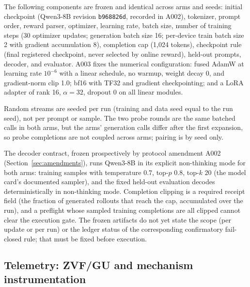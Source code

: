 \documentclass[11pt]{article}
\begin{document}
The following components are frozen and identical across arms and seeds: initial checkpoint (Qwen3-8B revision \texttt{b968826d}, recorded in A002), tokenizer, prompt order, reward parser, optimizer, learning rate, batch size, number of training steps (30 optimizer updates; generation batch size 16; per-device train batch size 2 with gradient accumulation 8), completion cap (1{,}024 tokens), checkpoint rule (final registered checkpoint, never selected by online reward), held-out prompts, decoder, and evaluator. A003 fixes the numerical configuration: fused AdamW at learning rate $10^{-6}$ with a linear schedule, no warmup, weight decay 0, and gradient-norm clip 1.0; bf16 with TF32 and gradient checkpointing; and a LoRA adapter of rank 16, $\alpha=32$, dropout 0 on all linear modules.

Random streams are seeded per run (training and data seed equal to the run seed), not per prompt or sample. The two probe rounds are the same batched calls in both arms, but the arms' generation calls differ after the first expansion, so probe completions are not coupled across arms; pairing is by seed only.

The decoder contract, frozen prospectively by protocol amendment A002 (Section~\ref{sec:amendments}), runs Qwen3-8B in its explicit non-thinking mode for both arms: training samples with temperature $0.7$, top-$p$ $0.8$, top-$k$ $20$ (the model card's documented sampler), and the fixed held-out evaluation decodes deterministically in non-thinking mode. Completion clipping is a required receipt field (the fraction of generated rollouts that reach the cap, accumulated over the run), and a preflight whose sampled training completions are all clipped cannot clear the execution gate. The frozen artifacts do not yet state the scope (per update or per run) or the ledger status of the corresponding confirmatory fail-closed rule; that must be fixed before execution.

\subsection{Telemetry: ZVF/GU and mechanism instrumentation}
\end{document}
